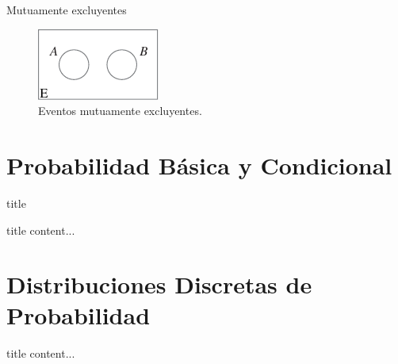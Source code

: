 \documentclass[11pt]{beamer}
\begin{document}
      \begin{frame}{Mutuamente excluyentes}
        \begin{figure}
            \centering
            \includegraphics[width=0.7\linewidth]{images/estadistica5}
            \caption{Eventos mutuamente
excluyentes.}
            \label{fig:estadistica5}
        \end{figure}

      \end{frame}















    \section*{Probabilidad Básica y Condicional}
      \begin{frame}{title}
        \begin{block}{title}
            content...
        \end{block}
      \end{frame}

    \section*{Distribuciones Discretas de Probabilidad}
    \begin{frame}{title}
        content...
    \end{frame}
\end{document}

